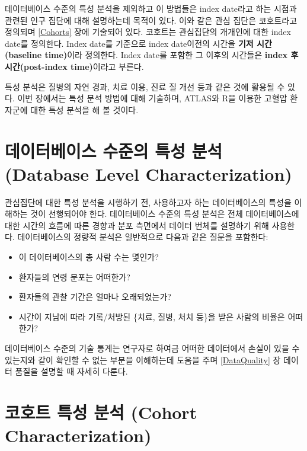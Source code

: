 \documentclass[11pt]{book}
\providecommand{\tightlist}{%
  \setlength{\itemsep}{0pt}\setlength{\parskip}{0pt}}
\theoremstyle{definition}
\theoremstyle{definition}
\theoremstyle{definition}
\theoremstyle{remark}
\begin{document}
데이터베이스 수준의 특성 분석을 제외하고 이 방법들은 index date라고 하는
시점과 관련된 인구 집단에 대해 설명하는데 목적이 있다. 이와 같은 관심
집단은 코호트라고 정의되며 \ref{Cohorts} 장에 기술되어 있다. 코호트는
관심집단의 개개인에 대한 index date를 정의한다. Index date를 기준으로
index date이전의 시간을 \textbf{기저 시간(baseline time)}이라 정의한다.
Index date를 포함한 그 이후의 시간들은 \textbf{index 후 시간(post-index
time)}이라고 부른다.

특성 분석은 질병의 자연 경과, 치료 이용, 진료 질 개선 등과 같은 것에
활용될 수 있다. 이번 장에서는 특성 분석 방법에 대해 기술하며, ATLAS와
R을 이용한 고혈압 환자군에 대한 특성 분석을 해 볼
것이다.
  

\section{데이터베이스 수준의 특성 분석 (Database Level
Characterization)}\label{----database-level-characterization}

관심집단에 대한 특성 분석을 시행하기 전, 사용하고자 하는 데이터베이스의
특성을 이해하는 것이 선행되어야 한다. 데이터베이스 수준의 특성 분석은
전체 데이터베이스에 대한 시간의 흐름에 따른 경향과 분포 측면에서 데이터
번체를 설명하기 위해 사용한다. 데이터베이스의 정량적 분석은 일반적으로
다음과 같은 질문을 포함한다:

\begin{itemize}
\tightlist
\item
  이 데이터베이스의 총 사람 수는 몇인가?
\item
  환자들의 연령 분포는 어떠한가?
\item
  환자들의 관찰 기간은 얼마나 오래되었는가?
\item
  시간이 지남에 따라 기록/처방된 \{치료, 질병, 처치 등\}을 받은 사람의
  비율은 어떠한가?
\end{itemize}

데이터베이스 수준의 기술 통계는 연구자로 하여금 어떠한 데이터에서 손실이
있을 수 있는지와 같이 확인할 수 없는 부분을 이해하는데 도움을 주며
\ref{DataQuality} 장 데이터 품질을 설명할 때 자세히 다룬다.

\section{코호트 특성 분석 (Cohort
Characterization)}\label{---cohort-characterization}
\end{document}
